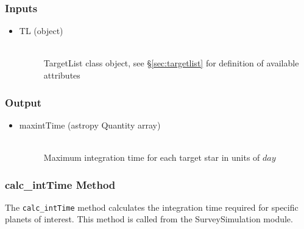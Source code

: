 \documentclass[cleanfoot]{asme2ej}
\begin{document}
\subsubsection*{Inputs}
\begin{itemize}
    \item 
    \begin{description}
        \item[TL (object)] \hfill \\ TargetList class object, see \S\ref{sec:targetlist} for definition of available attributes
    \end{description}
\end{itemize}
\subsubsection*{Output}
\begin{itemize}
    \item
    \begin{description}
        \item[maxintTime (astropy Quantity array)] \hfill \\ Maximum integration time for each target star in units of $ day $
    \end{description}
\end{itemize}

\subsubsection{calc\_intTime Method} \label{sec:calcintTimetask}
The \verb+calc_intTime+ method calculates the integration time required for specific planets of interest.  This method is called from the SurveySimulation module.
\end{document}

